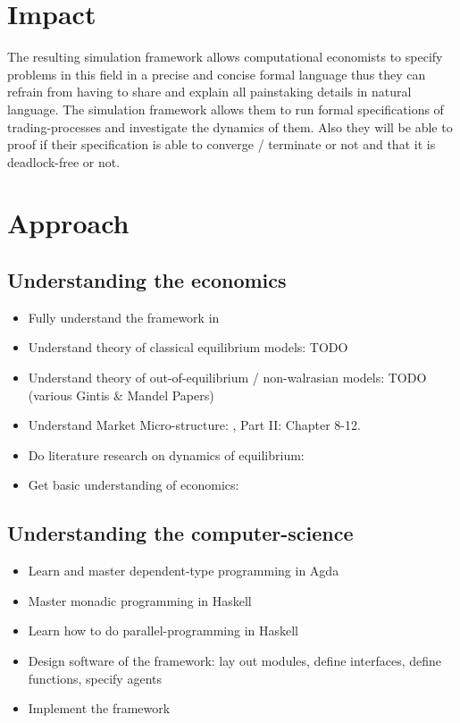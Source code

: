 \documentclass{article}
\begin{document}
\section{Impact}
The resulting simulation framework allows computational economists to specify problems in this field in a precise and concise formal language thus they can refrain from having to share and explain all painstaking details in natural language. The simulation framework allows them to run formal specifications of trading-processes and investigate the dynamics of them. Also they will be able to proof if their specification is able to converge / terminate or not and that it is deadlock-free or not.



\section{Approach}

\subsection{Understanding the economics}
\begin{itemize}
\item Fully understand the framework in \cite{Botta20114025}
\item Understand theory of classical equilibrium models: TODO
\item Understand theory of out-of-equilibrium / non-walrasian models: TODO (various Gintis \& Mandel Papers)
\item Understand Market Micro-structure: \cite{LehalleLaruelle2013}, \cite{baker_market_2013} Part II: Chapter 8-12.
\item Do literature research on dynamics of equilibrium: \cite{emergent_2008}
\item Get basic understanding of economics: \cite{bowles_understanding_2005}
\end{itemize}

\subsection{Understanding the computer-science}
\begin{itemize}
\item Learn and master  dependent-type programming in Agda
\item Master monadic programming in Haskell
\item Learn how to do parallel-programming in Haskell
\item Design software of the framework: lay out modules, define interfaces, define functions, specify agents
\item Implement the framework
\end{itemize}
\end{document}
